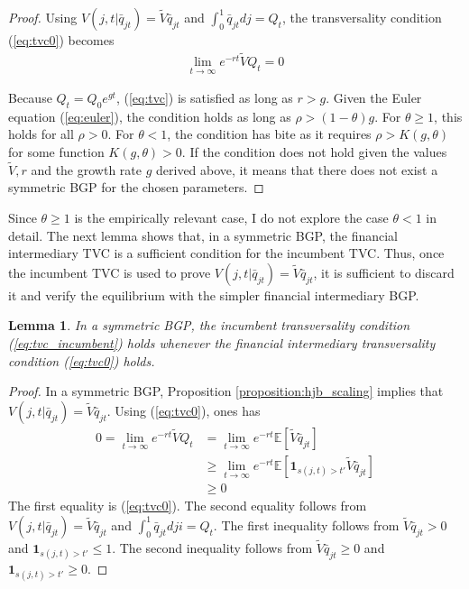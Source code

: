 \documentclass[11pt,english]{article}
\newtheorem{lemma}{Lemma}
\begin{document}
\begin{proof}
	Using $V(j,t|\bar{q}_{jt}) = \tilde{V} \bar{q}_{jt}$ and $\int_0^1 \bar{q}_{jt} dj = Q_t$, the transversality condition (\ref{eq:tvc0}) becomes
	\begin{align}
	\lim_{t \to \infty} e^{-rt} \tilde{V} Q_t = 0 \label{eq:tvc}
	\end{align}
	
	Because $Q_t = Q_0 e^{gt}$, (\ref{eq:tvc}) is satisfied as long as $r > g$. Given the Euler equation (\ref{eq:euler}), the condition holds as long as $\rho > (1-\theta)g$.  For $\theta \ge 1$, this holds for all $\rho > 0$.  For $\theta < 1$, the condition has bite as it requires $\rho > K(g,\theta)$ for some function $K(g,\theta) > 0$. If the condition does not hold given the values $\tilde{V},r$ and the growth rate $g$ derived above, it means that there does not exist a symmetric BGP for the chosen parameters. 
\end{proof}

Since $\theta \ge 1$ is the empirically relevant case, I do not explore the case $\theta < 1$ in detail. The next lemma shows that, in a symmetric BGP, the financial intermediary TVC is a sufficient condition for the incumbent TVC. Thus, once the incumbent TVC is used to prove $V(j,t|\bar{q}_{jt}) = \tilde{V} \bar{q}_{jt}$, it is sufficient to discard it and verify the equilibrium with the simpler financial intermediary BGP. 

\begin{lemma}
	In a symmetric BGP, the incumbent transversality condition (\ref{eq:tvc_incumbent}) holds whenever the financial intermediary transversality condition (\ref{eq:tvc0}) holds.
\end{lemma}

\begin{proof}
	In a symmetric BGP, Proposition \ref{proposition:hjb_scaling} implies that $V(j,t|\bar{q}_{jt}) = \tilde{V} \bar{q}_{jt}$. Using (\ref{eq:tvc0}), ones has 
	\begin{align}
		0 = \lim_{t \to \infty} e^{-rt} \tilde{V}Q_t &= \lim_{t \to \infty} e^{-rt} \mathbb{E}[ \tilde{V} \bar{q}_{jt} ] \\
												 &\ge \lim_{t \to \infty} e^{-rt} \mathbb{E} [\mathbf{1}_{s(j,t) > t'} \tilde{V} \bar{q}_{jt}] \\
												 &\ge 0
	\end{align}
	The first equality is (\ref{eq:tvc0}). The second equality follows from $V(j,t|\bar{q}_{jt}) = \tilde{V} \bar{q}_{jt}$ and $\int_0^1 \bar{q}_{jt} dji = Q_t$. The first inequality follows from $\tilde{V} \bar{q}_{jt} > 0$ and $\mathbf{1}_{s(j,t) > t'} \le 1$. The second inequality follows from $\tilde{V}\bar{q}_{jt} \ge 0$ and $\mathbf{1}_{s(j,t) > t'} \ge 0$. 
\end{proof}
\end{document}
